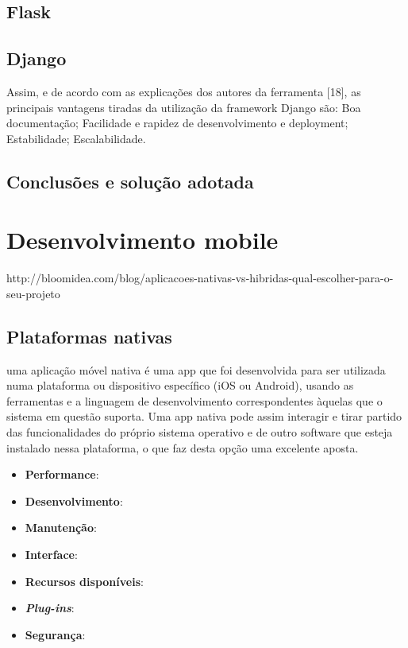 \subsection{Flask}

\subsection{Django}


Assim, e de acordo com as explicações dos autores da ferramenta [18], as
principais vantagens tiradas da utilização da framework Django são:
Boa documentação;
Facilidade e rapidez de desenvolvimento e deployment;
Estabilidade;
Escalabilidade.


\subsection{Conclusões e solução adotada}



\newpage
\section{Desenvolvimento mobile}


http://bloomidea.com/blog/aplicacoes-nativas-vs-hibridas-qual-escolher-para-o-seu-projeto	

\subsection{Plataformas nativas}


uma aplicação móvel nativa é uma app que foi desenvolvida para ser utilizada numa plataforma ou dispositivo específico (iOS ou Android), usando as ferramentas e a linguagem de desenvolvimento correspondentes àquelas que o sistema em questão suporta. Uma app nativa pode assim interagir e tirar partido das funcionalidades do próprio sistema operativo e de outro software que esteja instalado nessa plataforma, o que faz desta opção uma excelente aposta.


\begin{itemize}
	\item \textbf{Performance}: 
	\item \textbf{Desenvolvimento}: 
	\item \textbf{Manutenção}: 
	\item \textbf{Interface}: 
	\item \textbf{Recursos disponíveis}: 
	\item \textbf{\textit{Plug-ins}}: 
	\item \textbf{Segurança}: 
\end{itemize}



